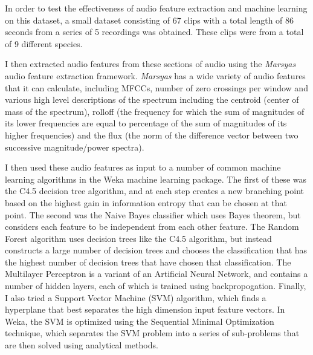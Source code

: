 \documentclass[12pt,oneside]{book}
\begin{document}
In order to test the effectiveness of audio feature extraction and
machine learning on this dataset, a small dataset consisting of 67
clips with a total length of 86 seconds from a series of 5 recordings
was obtained.  These clips were from a total of 9 different species.

I then extracted audio features from these sections of audio using
the \textit{Marsyas} \cite{tzanetakis2008marsyas} audio feature extraction framework.
\textit{Marsyas} has a wide variety of audio features that it can calculate,
including MFCCs, number of zero crossings per window and various high
level descriptions of the spectrum including the centroid (center of
mass of the spectrum), rolloff (the frequency for which the sum of
magnitudes of its lower frequencies are equal to percentage of the sum
of magnitudes of its higher frequencies) and the flux (the norm of the
difference vector between two successive magnitude/power spectra).

I then used these audio features as input to a number of common
machine learning algorithms in the Weka \cite{witten2005weka} machine
learning package.  The first of these was the C4.5 decision tree
algorithm, and at each step creates a new branching point based on the
highest gain in information entropy that can be chosen at that point.
The second was the Naive Bayes classifier which uses Bayes theorem,
but considers each feature to be independent from each other feature.
The Random Forest algorithm uses decision trees like the C4.5
algorithm, but instead constructs a large number of decision trees and
chooses the classification that has the highest number of decision
trees that have chosen that classification.  The Multilayer Perceptron
is a variant of an Artificial Neural Network, and contains a number of
hidden layers, each of which is trained using backpropogation.
Finally, I also tried a Support Vector Machine (SVM) algorithm, which
finds a hyperplane that best separates the high dimension input
feature vectors.  In Weka, the SVM is optimized using the Sequential
Minimal Optimization technique, which separates the SVM problem into a
series of sub-problems that are then solved using analytical methods.
\end{document}
